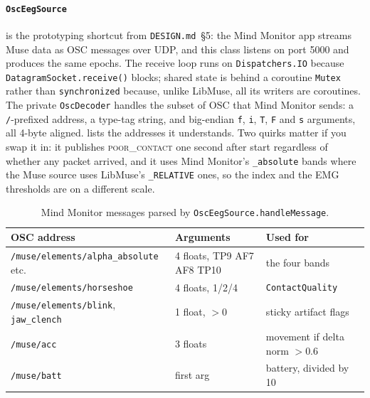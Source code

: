 \documentclass[10pt,a4paper]{article}
\newcommand{\file}[1]{\texttt{\small #1}}          %
\newcommand{\code}[1]{\texttt{#1}}                  %
\begin{document}
\paragraph{\code{OscEegSource}} is the prototyping shortcut from \file{DESIGN.md}~\S5: the Mind
Monitor app streams Muse data as OSC messages over UDP, and this class listens on port 5000 and
produces the same epochs. The receive loop runs on \code{Dispatchers.IO} because
\code{DatagramSocket.receive()} blocks; shared state is behind a coroutine \code{Mutex} rather than
\code{synchronized} because, unlike LibMuse, all its writers are coroutines. The private
\code{OscDecoder} handles the subset of OSC that Mind Monitor sends: a \code{/}-prefixed address,
a type-tag string, and big-endian \code{f}, \code{i}, \code{T}, \code{F} and \code{s} arguments,
all 4-byte aligned.  lists the addresses it understands. Two quirks matter if you
swap it in: it publishes \textsc{poor\_contact} one second after start regardless of whether any
packet arrived, and it uses Mind Monitor's \code{\_absolute} bands where the Muse source uses
LibMuse's \code{\_RELATIVE} ones, so the index and the EMG thresholds are on a different scale.

\begin{table}[htbp]\centering\small
\begin{tabular}{@{}l l l@{}}
\toprule
\textbf{OSC address} & \textbf{Arguments} & \textbf{Used for} \\
\midrule
\code{/muse/elements/alpha\_absolute} etc. & 4 floats, TP9 AF7 AF8 TP10 & the four bands \\
\code{/muse/elements/horseshoe} & 4 floats, 1/2/4 & \code{ContactQuality} \\
\code{/muse/elements/blink}, \code{jaw\_clench} & 1 float, $>0$ & sticky artifact flags \\
\code{/muse/acc} & 3 floats & movement if delta norm $>0.6$ \\
\code{/muse/batt} & first arg & battery, divided by 10 \\
\bottomrule
\end{tabular}
\caption{Mind Monitor messages parsed by \code{OscEegSource.handleMessage}.}\label{tab:osc}
\end{table}
\end{document}
